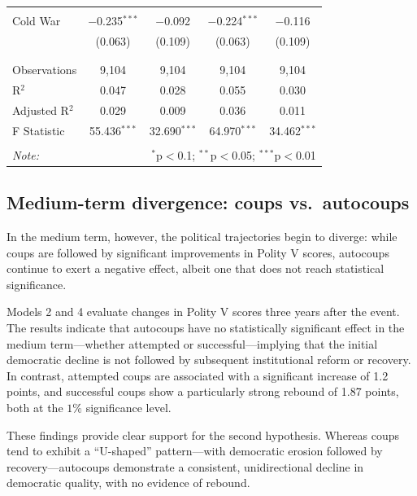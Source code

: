\documentclass[
  12pt,
]{report}
\begin{document}
\begin{table}
{\begin{tabular}{@{\extracolsep{30pt}}lcccc}
  & & & & \\ 
 Cold War & $-$0.235$^{***}$ & $-$0.092 & $-$0.224$^{***}$ & $-$0.116 \\ 
  & (0.063) & (0.109) & (0.063) & (0.109) \\ 
  & & & & \\ 
\hline \\[-1.8ex] 
Observations & 9,104 & 9,104 & 9,104 & 9,104 \\ 
R$^{2}$ & 0.047 & 0.028 & 0.055 & 0.030 \\ 
Adjusted R$^{2}$ & 0.029 & 0.009 & 0.036 & 0.011 \\ 
F Statistic & 55.436$^{***}$ & 32.690$^{***}$ & 64.970$^{***}$ & 34.462$^{***}$ \\ 
\hline 
\hline \\[-1.8ex] 
\textit{Note:}  & \multicolumn{4}{r}{$^{*}$p$<$0.1; $^{**}$p$<$0.05; $^{***}$p$<$0.01} \\ 
\end{tabular}

}

\end{table}%

\subsection*{Medium-term divergence: coups
vs.~autocoups}\label{medium-term-divergence-coups-vs.-autocoups}

In the medium term, however, the political trajectories begin to
diverge: while coups are followed by significant improvements in Polity
V scores, autocoups continue to exert a negative effect, albeit one that
does not reach statistical significance.

Models 2 and 4 evaluate changes in Polity V scores three years after the
event. The results indicate that autocoups have no statistically
significant effect in the medium term---whether attempted or
successful---implying that the initial democratic decline is not
followed by subsequent institutional reform or recovery. In contrast,
attempted coups are associated with a significant increase of 1.2
points, and successful coups show a particularly strong rebound of 1.87
points, both at the \(1\%\) significance level.

These findings provide clear support for the second hypothesis. Whereas
coups tend to exhibit a ``U-shaped'' pattern---with democratic erosion
followed by recovery---autocoups demonstrate a consistent,
unidirectional decline in democratic quality, with no evidence of
rebound.
\end{document}
